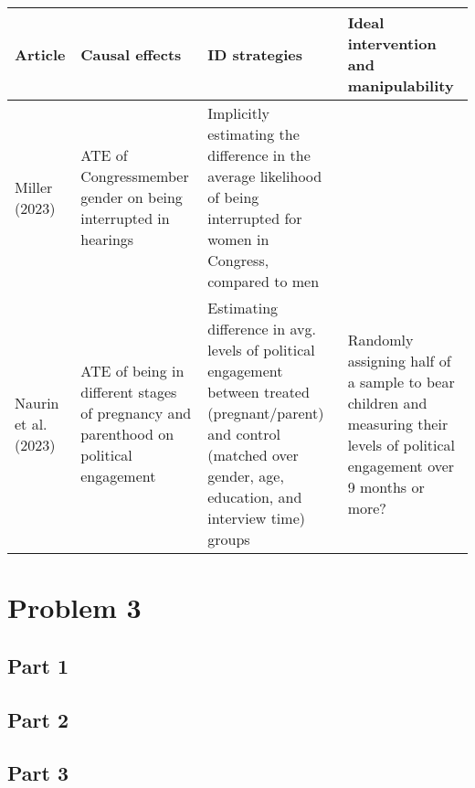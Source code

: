 \documentclass[12pt]{article}
\begin{document}
\begin{table}
\begin{tabular}{l|p{1.5in}|p{1.5in}|p{1.5in}}
Article & Causal effects & ID strategies & Ideal intervention and manipulability\\
\hline
Miller (2023) & ATE of Congressmember gender on being interrupted in hearings & Implicitly estimating the difference in the average likelihood of being interrupted for women in Congress, compared to men & \\
\hline
Naurin et al. (2023) & ATE of being in different stages of pregnancy and parenthood on political engagement & Estimating difference in avg. levels of political engagement between treated (pregnant/parent) and control (matched over gender, age, education, and interview time) groups & Randomly assigning half of a sample to bear children and measuring their levels of political engagement over 9 months or more?
\end{tabular}
\end{table}

\section*{Problem 3}

\subsection*{Part 1}

\subsection*{Part 2}

\subsection*{Part 3}
\end{document}
